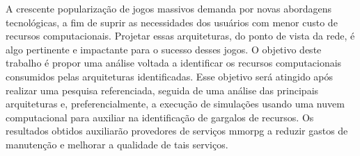 A crescente popularização de jogos massivos demanda por novas abordagens tecnológicas, a fim de suprir as necessidades dos usuários com menor custo de recursos computacionais.
%
Projetar essas arquiteturas, do ponto de vista da rede, é algo pertinente e impactante para o sucesso desses jogos.
%
O objetivo deste trabalho é propor uma análise voltada a identificar os recursos computacionais consumidos pelas arquiteturas identificadas.
%
Esse objetivo será atingido após realizar uma pesquisa referenciada, seguida de uma análise das principais arquiteturas e, preferencialmente, a execução de simulações usando uma nuvem computacional para auxiliar na identificação de gargalos de recursos. 
%
Os resultados obtidos auxiliarão provedores de serviços \ac{mmorpg} a reduzir gastos de manutenção e melhorar a qualidade de tais serviços.
